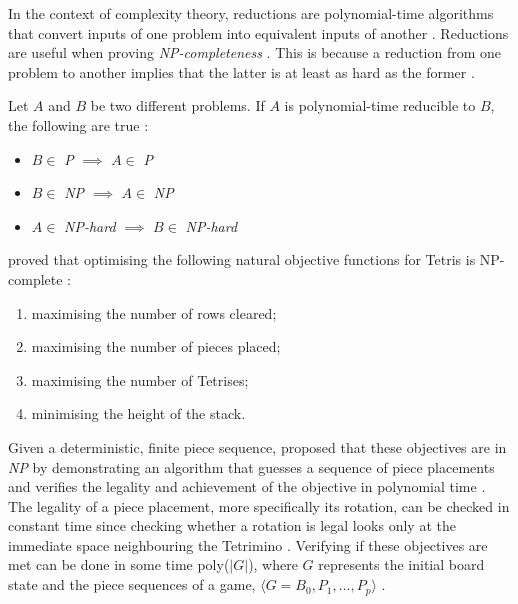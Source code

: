 \documentclass[a4paper, 12pt]{extreport}
\begin{document}
				In the context of complexity theory, reductions are polynomial-time algorithms that convert inputs of one problem into equivalent inputs of another \cite{npcompleteness}. Reductions are useful when proving \textit{NP-completeness} \cite{cc:modern}. This is because a reduction from one problem to another implies that the latter is at least as hard as the former \cite{cc:modern}.
				
				Let $A$ and $B$ be two different problems. If $A$ is polynomial-time reducible to $B$, the following are true \cite{npcompleteness}:
				
				\begin{itemize}
					\item $B \in $ \textit{P} $\implies$ $A \in $ \textit{P}
					\item $B \in $ \textit{NP} $\implies$ $A \in $ \textit{NP}
					\item $A \in $ \textit{NP-hard} $\implies$ $B \in$ \textit{NP-hard}
				\end{itemize}
				
				\citeauthor{tetris-is-hard-even-to-approx} proved that optimising the following natural objective functions for Tetris is NP-complete \cite{tetris-is-hard-even-to-approx}:
				
				\begin{enumerate}
					\item maximising the number of rows cleared;
					\item maximising the number of pieces placed;
					\item maximising the number of Tetrises;
					\item minimising the height of the stack.
				\end{enumerate}
				
				Given a deterministic, finite piece sequence, \citeauthor{tetris-is-hard-even-to-approx} proposed that these objectives are in \textit{NP} by demonstrating an algorithm that  guesses a sequence of piece placements and verifies the legality and achievement of the objective in polynomial time \cite{tetris-is-hard-even-to-approx}. The legality of a piece placement, more specifically its rotation, can be checked in constant time since checking whether a rotation is legal looks only at the immediate space neighbouring the Tetrimino \cite{tetris-is-hard-even-to-approx}. Verifying if these objectives are met can be done in some time poly($|G|$), where $G$ represents the initial board state and the piece sequences of a game, $\langle G = B_0, P_1, ... , P_p \rangle$ \cite{tetris-is-hard-even-to-approx}.
				
\end{document}
